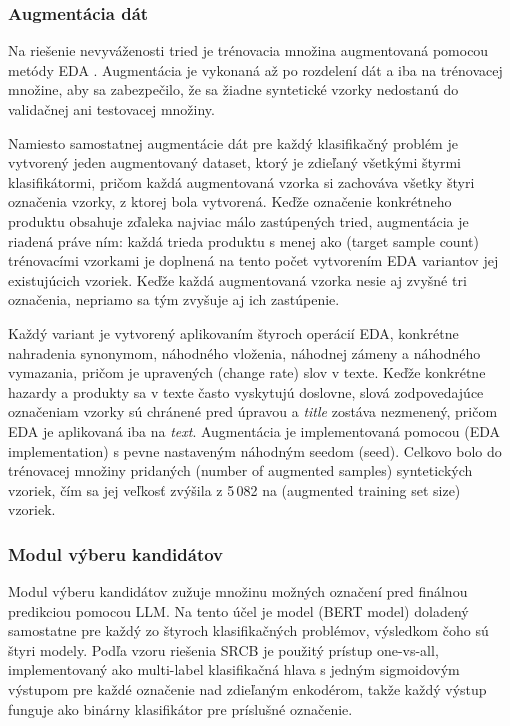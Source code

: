 \subsubsection{Augmentácia dát}

Na riešenie nevyváženosti tried je trénovacia množina augmentovaná pomocou metódy EDA \cite{wei2019eda}. Augmentácia je vykonaná až po rozdelení dát a iba na trénovacej množine, aby sa zabezpečilo, že sa žiadne syntetické vzorky nedostanú do validačnej ani testovacej množiny.

Namiesto samostatnej augmentácie dát pre každý klasifikačný problém je vytvorený jeden augmentovaný dataset, ktorý je zdieľaný všetkými štyrmi klasifikátormi, pričom každá augmentovaná vzorka si zachováva všetky štyri označenia vzorky, z ktorej bola vytvorená. Keďže označenie konkrétneho produktu obsahuje zďaleka najviac málo zastúpených tried, augmentácia je riadená práve ním: každá trieda produktu s menej ako (target sample count) trénovacími vzorkami je doplnená na tento počet vytvorením EDA variantov jej existujúcich vzoriek. Keďže každá augmentovaná vzorka nesie aj zvyšné tri označenia, nepriamo sa tým zvyšuje aj ich zastúpenie.

Každý variant je vytvorený aplikovaním štyroch operácií EDA, konkrétne nahradenia synonymom, náhodného vloženia, náhodnej zámeny a náhodného vymazania, pričom je upravených (change rate) slov v texte. Keďže konkrétne hazardy a produkty sa v texte často vyskytujú doslovne, slová zodpovedajúce označeniam vzorky sú chránené pred úpravou a \textit{title} zostáva nezmenený, pričom EDA je aplikovaná iba na \textit{text}. Augmentácia je implementovaná pomocou (EDA implementation) s pevne nastaveným náhodným seedom (seed). Celkovo bolo do trénovacej množiny pridaných (number of augmented samples) syntetických vzoriek, čím sa jej veľkosť zvýšila z 5\,082 na (augmented training set size) vzoriek.

\subsubsection{Modul výberu kandidátov}

Modul výberu kandidátov zužuje množinu možných označení pred finálnou predikciou pomocou LLM. Na tento účel je model (BERT model) doladený samostatne pre každý zo štyroch klasifikačných problémov, výsledkom čoho sú štyri modely. Podľa vzoru riešenia SRCB je použitý prístup one-vs-all, implementovaný ako multi-label klasifikačná hlava s jedným sigmoidovým výstupom pre každé označenie nad zdieľaným enkodérom, takže každý výstup funguje ako binárny klasifikátor pre príslušné označenie.

